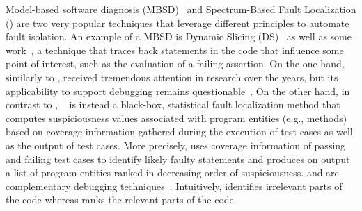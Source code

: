 \documentclass{article}
\begin{document}
Model-based software diagnosis (MBSD)~\cite{REITER198757,DEKLEER200325} and
Spectrum-Based Fault Localization (\sfl{}) are two very popular techniques that
leverage different principles to automate fault isolation. An example of a MBSD
is Dynamic Slicing (DS)~\cite{Agrawal:1990:DPS:93542.93576} as well as some
work~\cite{wotawa2002model,Mayer:2008:EMM:1642931.1642950,mayer2008prioritising,Perez:2018:LQR:3304889.3304927,Ko:2008:DRA:1368088.1368130},
a technique that traces back statements in the code that influence some point of
interest, such as the evaluation of a failing assertion. On the one hand, similarly to \ds{},
\sfl{} received tremendous attention in research over the years, but its
applicability to support debugging remains
questionable~\cite{ang-perez-van-deursen-rui-2017,Pearson:2017:EIF:3097368.3097441,Xie:2016:RAD:2884781.2884834}.
On the other hand, in contrast to \ds{},
\sfl{}~\cite{7390282} is instead a black-box,
statistical fault localization method that computes suspiciousness values
associated with program entities (e.g., methods) based on coverage information
gathered during the execution of test cases as well as the output of test cases.
More precisely, \sfl{} uses coverage information of passing and failing test
cases to identify likely faulty statements and produces on output a list of
program entities ranked in decreasing order of suspiciousness. \ds{} and \sfl{}
are complementary debugging techniques~\cite{DBLP:conf/sac/AbreuGZG08}.
Intuitively, \ds{} identifies irrelevant parts of the code whereas \sfl{} ranks
the relevant parts of the code.


\end{document}
